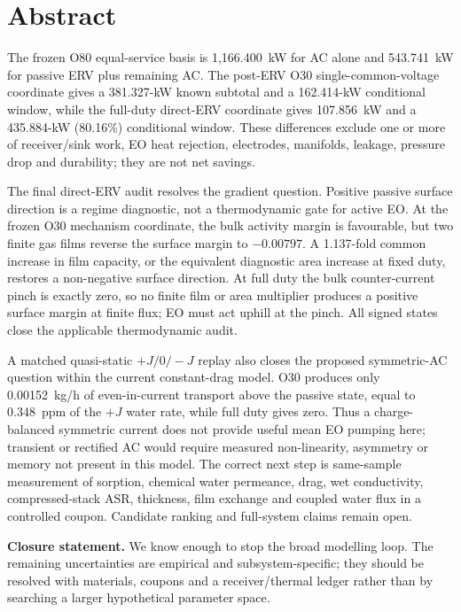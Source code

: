 \documentclass[10pt,a4paper]{article}
\begin{document}
\clearpage

\section*{Abstract}

The frozen O80 equal-service basis is 1,166.400~kW for AC alone and
543.741~kW for passive ERV plus remaining AC. The post-ERV O30
single-common-voltage coordinate gives a 381.327-kW known subtotal and a
162.414-kW conditional window, while the full-duty direct-ERV coordinate gives
107.856~kW and a 435.884-kW (80.16\%) conditional window. These differences
exclude one or more of receiver/sink work, EO heat rejection, electrodes,
manifolds, leakage, pressure drop and durability; they are not net savings.

The final direct-ERV audit resolves the gradient question. Positive passive
surface direction is a regime diagnostic, not a thermodynamic gate for active
EO. At the frozen O30 mechanism coordinate, the bulk activity margin is
favourable, but two finite gas films reverse the surface margin to
$-0.00797$. A 1.137-fold common increase in film capacity, or the equivalent
diagnostic area increase at fixed duty, restores a non-negative surface
direction. At full duty the bulk counter-current pinch is exactly zero, so no
finite film or area multiplier produces a positive surface margin at finite
flux; EO must act uphill at the pinch. All signed states close the applicable
thermodynamic audit.

A matched quasi-static $+J/0/-J$ replay also closes the proposed symmetric-AC
question within the current constant-drag model. O30 produces only
0.00152~kg/h of even-in-current transport above the passive state, equal to
0.348~ppm of the $+J$ water rate, while full duty gives zero. Thus a
charge-balanced symmetric current does not provide useful mean EO pumping here;
transient or rectified AC would require measured non-linearity, asymmetry or
memory not present in this model. The correct next step is same-sample
measurement of sorption, chemical water permeance, drag, wet conductivity,
compressed-stack ASR, thickness, film exchange and coupled water flux in a
controlled coupon. Candidate ranking and full-system claims remain open.

\begin{mainbox}
\textbf{Closure statement.} We know enough to stop the broad modelling loop.
The remaining uncertainties are empirical and subsystem-specific; they should
be resolved with materials, coupons and a receiver/thermal ledger rather than
by searching a larger hypothetical parameter space.
\end{mainbox}
\end{document}
